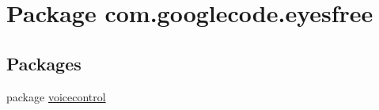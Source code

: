 \hypertarget{namespacecom_1_1googlecode_1_1eyesfree}{\section{Package com.\-googlecode.\-eyesfree}
\label{namespacecom_1_1googlecode_1_1eyesfree}
}
\subsection*{Packages}
\begin{DoxyCompactItemize}
\item 
package \hyperlink{namespacecom_1_1googlecode_1_1eyesfree_1_1voicecontrol}{voicecontrol}
\end{DoxyCompactItemize}
